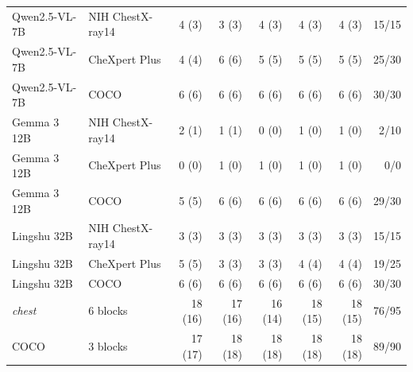 \documentclass{article}
\providecommand{\DIFaddendFL}{} %
\DeclareRobustCommand{\DIFaddendFL}{\DIFOaddendFL \let\includegraphics\DIFOincludegraphics} %
\begin{document}
\begin{table}[h]
{\begin{tabular}{llrrrrrr}
\midrule
Qwen2.5-VL-7B & NIH ChestX-ray14 & 4 (3) & 3 (3) & 4 (3) & 4 (3) & 4 (3) & 15/15 \\
Qwen2.5-VL-7B & CheXpert Plus & 4 (4) & 6 (6) & 5 (5) & 5 (5) & 5 (5) & 25/30 \\
Qwen2.5-VL-7B & COCO & 6 (6) & 6 (6) & 6 (6) & 6 (6) & 6 (6) & 30/30 \\
Gemma 3 12B & NIH ChestX-ray14 & 2 (1) & 1 (1) & 0 (0) & 1 (0) & 1 (0) & 2/10 \\
Gemma 3 12B & CheXpert Plus & 0 (0) & 1 (0) & 1 (0) & 1 (0) & 1 (0) & 0/0 \\
Gemma 3 12B & COCO & 5 (5) & 6 (6) & 6 (6) & 6 (6) & 6 (6) & 29/30 \\
Lingshu 32B & NIH ChestX-ray14 & 3 (3) & 3 (3) & 3 (3) & 3 (3) & 3 (3) & 15/15 \\
Lingshu 32B & CheXpert Plus & 5 (5) & 3 (3) & 3 (3) & 4 (4) & 4 (4) & 19/25 \\
Lingshu 32B & COCO & 6 (6) & 6 (6) & 6 (6) & 6 (6) & 6 (6) & 30/30 \\
\midrule
\textit{chest} & 6 blocks & 18 (16) & 17 (16) & 16 (14) & 18 (15) & 18 (15) & 76/95 \\
COCO & 3 blocks & 17 (17) & 18 (18) & 18 (18) & 18 (18) & 18 (18) & 89/90 \\
\bottomrule
\end{tabular}}
\DIFaddendFL \end{table}
\end{document}
